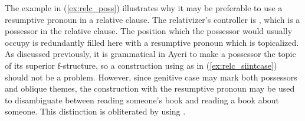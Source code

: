 The example in (\ref{ex:relc_poss}) illustrates why it may be preferable to use
a resumptive pronoun in a relative clause. The relativizer's controller is
, which is a possessor in the relative clause. The
position which the possessor would usually occupy is redundantly filled here
with a resumptive pronoun which is topicalized. As discussed
previously, it is grammatical in Ayeri to make a possessor the topic of its
superior f-structure, so a construction using  as in
(\ref{ex:relc_siintcase}) should not be a problem. However, since genitive case
may mark both possessors and oblique themes, the construction
with the resumptive pronoun may be used to disambiguate between reading
someone's book and reading a book about someone. This distinction is
obliterated by using .

